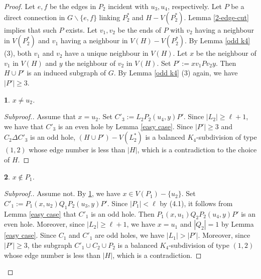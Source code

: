\documentclass[11pt]{article}
\newtheorem{claim}{}[theorem]
\newcommand{\del}{\backslash}
\begin{document}
\begin{proof}
Let $e,f$ be the edges in $P_2$ incident with $u_3,u_4$, respectively.
Let $P$ be a direct connection in $G\del\{e,f\}$ linking $P^*_2$ and $H-V(P^*_2)$. Lemma \ref{2-edge-cut} implies that such $P$ exists. Let $v_1,v_2$ be the ends of $P$ with $v_2$ having a neighbour in $V(P^*_2)$ and $v_1$ having a neighbour in $V(H)-V(P^*_2)$. By Lemma \ref{odd k4} (3), both $v_1$ and $v_2$ have a unique neighbour in $V(H)$. Let $x$ be the neighbour of $v_1$ in $V(H)$ and $y$ the neighbour of $v_2$ in $V(H)$. Set $P':=xv_1Pv_2y$. Then $H\cup P'$ is an induced subgraph of $G$. By Lemma \ref{odd k4} (3) again, we have $|P'|\geq3$.

\begin{claim}\label{x=u2}
$x\neq u_2$.
\end{claim}
\begin{proof}[Subproof.]
Assume that $x=u_2$. Set $C'_3:=L_2P_2(u_4,y)P'$. Since $|L_2|\geq\ell+1$, we have that $C'_3$ is an even hole by Lemma \ref{easy case}. Since $|P'|\geq3$ and $C_2\Delta C'_3$ is an odd hole, $(H\cup P')-V(L^*_2)$ is a balanced $K_4$-subdivision of type $(1,2)$ whose  edge number is less than $|H|$, which is a contradiction to the choice of $H$.
\end{proof}

\begin{claim}\label{location 1}
$x\notin P_1$.
\end{claim}
\begin{proof}[Subproof.]
Assume not. By \ref{x=u2}, we have $x\in V(P_1)-\{u_2\}$. Set $C'_1:=P_1(x,u_2)Q_1P_2(u_3,y)P'$. Since $|P_1|<\ell$ by (4.1), it follows from Lemma \ref{easy case} that $C'_1$ is an odd hole. Then $P_1(x,u_1)Q_2P_2(u_4,y)P'$ is an even hole. Moreover, since $|L_2|\geq\ell+1$, we have $x=u_1$ and $|Q_2|=1$ by Lemma \ref{easy case}. Since $C_1$ and $C'_1$ are odd holes, we have $|L_1|>|P'|$. Moreover, since $|P'|\geq3$, the subgraph $C'_1\cup C_2\cup P_2$ is a balanced $K_4$-subdivision of type $(1,2)$ whose  edge number is less than $|H|$, which is a contradiction.
\end{proof}


\end{proof}
\end{document}
